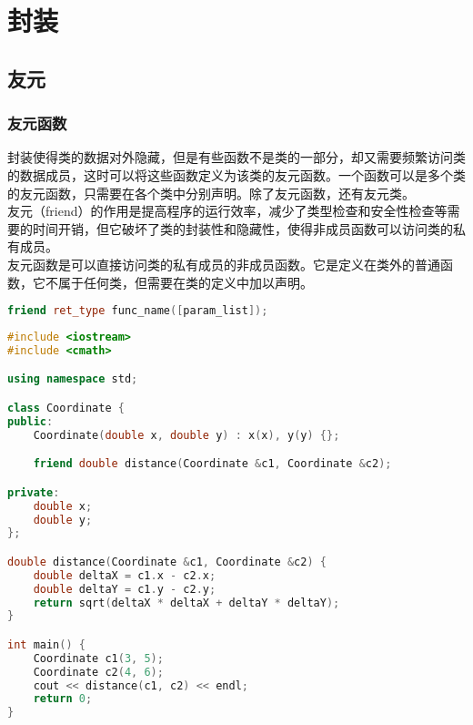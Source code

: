 \chapter{封装}

\section{友元}

\subsection{友元函数}

封装使得类的数据对外隐藏，但是有些函数不是类的一部分，却又需要频繁访问类的数据成员，这时可以将这些函数定义为该类的友元函数。一个函数可以是多个类的友元函数，只需要在各个类中分别声明。除了友元函数，还有友元类。\\

友元（friend）的作用是提高程序的运行效率，减少了类型检查和安全性检查等需要的时间开销，但它破坏了类的封装性和隐藏性，使得非成员函数可以访问类的私有成员。\\

友元函数是可以直接访问类的私有成员的非成员函数。它是定义在类外的普通函数，它不属于任何类，但需要在类的定义中加以声明。

\vspace{-0.5cm}

\begin{lstlisting}[language=C++]
friend ret_type func_name([param_list]);
\end{lstlisting}

\vspace{0.5cm}


\begin{lstlisting}[language=C++]
#include <iostream>
#include <cmath>

using namespace std;

class Coordinate {
public:
    Coordinate(double x, double y) : x(x), y(y) {};

    friend double distance(Coordinate &c1, Coordinate &c2);

private:
    double x;
    double y;
};

double distance(Coordinate &c1, Coordinate &c2) {
    double deltaX = c1.x - c2.x;
    double deltaY = c1.y - c2.y;
    return sqrt(deltaX * deltaX + deltaY * deltaY);
}

int main() {
    Coordinate c1(3, 5);
    Coordinate c2(4, 6);
    cout << distance(c1, c2) << endl;
    return 0;
}
\end{lstlisting}

